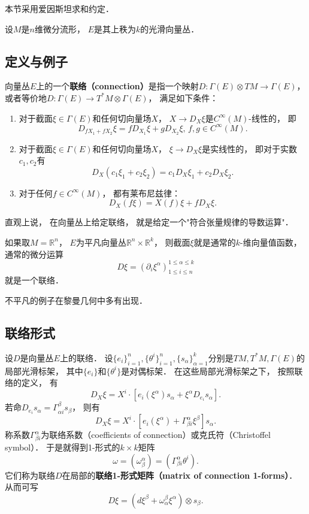 
本节采用爱因斯坦求和约定．

设$M$是$n$维微分流形， $E$是其上秩为$k$的光滑向量丛． 

\subsection{定义与例子}
向量丛$E$上的一个\textbf{联络（connection）}是指一个映射$D:\Gamma(E)\otimes TM\to\Gamma(E)$， 或者等价地$D:\Gamma(E)\to T^*M\otimes\Gamma(E)$， 满足如下条件：

\begin{enumerate}
\item 对于截面$\xi\in\Gamma(E)$和任何切向量场$X$， $X\to D_X\xi$是$C^\infty(M)$-线性的， 即
$$
D_{fX_1+fX_2}\xi=fD_{X_1}\xi+gD_{X_2}\xi,\,f,g\in C^\infty(M).
$$
\item 对于截面$\xi\in\Gamma(E)$和任何切向量场$X$， $\xi\to D_X\xi$是实线性的， 即对于实数$c_1,c_2$有
$$
D_X(c_1\xi_1+c_2\xi_2)=c_1D_X\xi_1+c_2D_X\xi_2.
$$
\item 对于任何$f\in C^\infty(M)$， 都有莱布尼兹律：
$$
D_X(f\xi)=X(f)\xi+fD_X\xi.
$$
\end{enumerate}

直观上说， 在向量丛上给定联络， 就是给定一个"符合张量规律的导数运算"． 

如果取$M=\mathbb{R}^n$， $E$为平凡向量丛$\mathbb{R}^n\times\mathbb{R}^k$， 则截面$\xi$就是通常的$k$-维向量值函数， 通常的微分运算
$$
D\xi=(\partial_i\xi^\alpha)_{1\leq i\leq n}^{1\leq\alpha\leq k}
$$
就是一个联络．

不平凡的例子在黎曼几何中多有出现．

\subsection{联络形式}
设$D$是向量丛$E$上的联络． 设$\{e_i\}_{i=1}^n,\{\theta^i\}_{i=1}^n,\{s_\alpha\}_{\alpha=1}^k$分别是$TM,T^*M,\Gamma(E)$的局部光滑标架， 其中$\{e_i\}$和$\{\theta^i\}$是对偶标架． 在这些局部光滑标架之下， 按照联络的定义， 有
$$
D_X\xi=X^i\cdot\left[e_i(\xi^\alpha)s_\alpha+\xi^\alpha D_{e_i}s_\alpha\right].
$$
若命$D_{e_i}s_\alpha=\Gamma_{\alpha i}^\beta s_\beta$， 则有
$$
D_X\xi=X^i\cdot\left[e_i(\xi^\alpha)+\Gamma_{\beta i}^\alpha\xi^\beta \right]s_\alpha.
$$
称系数$\Gamma^\alpha_{\beta i}$为联络系数（coefficients of connection）或克氏符（Christoffel symbol）． 于是就得到1-形式的$k\times k$矩阵
$$
\omega=(\omega_\beta^\alpha)=(\Gamma_{\beta i}^\alpha\theta^i).
$$
它们称为联络$D$在局部的\textbf{联络1-形式矩阵（matrix of connection 1-forms）}． 从而可写
$$
D\xi=(d\xi^\beta+\omega_\alpha^\beta\xi^\alpha)\otimes s_\beta.
$$

